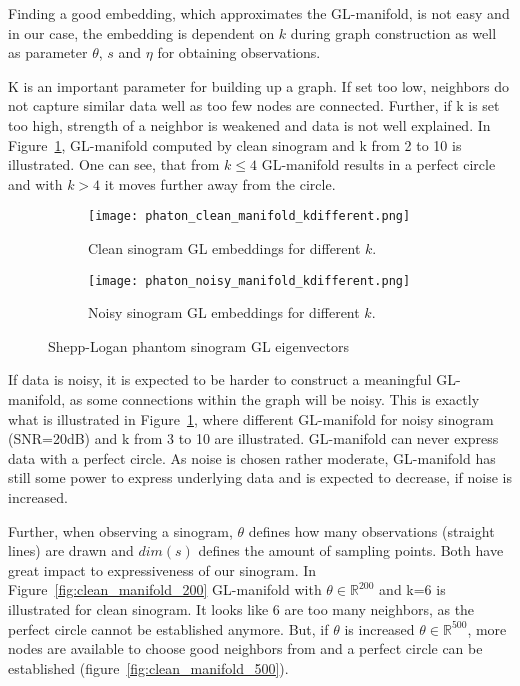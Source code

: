 Finding a good embedding, which approximates the GL-manifold, is not easy and in our case, the embedding is dependent on $k$ during graph construction
as well as parameter $\theta$, $s$ and $\eta$ for obtaining observations.

K is an important parameter for building up a graph. If set too low, neighbors
do not capture similar data well as too few nodes are connected. 
Further, if k is set too high, strength of a neighbor 
is weakened and data is not well explained.
In Figure~\ref{fig:clean_manifolds}, GL-manifold computed by clean sinogram and k from 2 to 10 is illustrated.
One can see, that from $k \leq 4$ GL-manifold results in a perfect circle and with $k >  4$ it moves 
further away from the circle. 


\begin{figure}[H]
    \captionsetup[subfigure]{justification=centering}
    \centering
    \begin{subfigure}[t]{0.45\textwidth}
        \texttt{[image: phaton\_clean\_manifold\_kdifferent.png]}
        \caption{Clean sinogram GL embeddings for different $k$.}
        \label{fig:clean_manifolds}
    \end{subfigure}\hfill
    \begin{subfigure}[t]{0.45\textwidth}
      \texttt{[image: phaton\_noisy\_manifold\_kdifferent.png]}
      \caption{Noisy sinogram GL embeddings for different $k$.}
      \label{fig:noisy_manifolds}
    \end{subfigure}\hfill
    \caption{Shepp-Logan phantom sinogram GL eigenvectors}
  \end{figure}

If data is noisy, it is expected to be harder to construct a meaningful GL-manifold, as some connections within
the graph will be noisy. This is exactly what is illustrated in Figure~\ref{fig:clean_manifolds}, where 
different GL-manifold for noisy sinogram (SNR=20dB) and k from 3 to 10 are illustrated.
GL-manifold can never express data with a perfect circle. As noise is chosen rather moderate, GL-manifold has still some 
power to express underlying data and is expected to decrease, if noise is increased.


Further, when observing a sinogram, $\theta$ defines how many observations (straight lines) are drawn
and $dim(s)$ defines the amount of sampling points. Both have great impact to expressiveness of our sinogram.
In Figure~\ref{fig:clean_manifold_200} GL-manifold with $\theta \in \mathbb{R}^{200}$ and k=6 is illustrated
for clean sinogram. It looks like 6 are too many neighbors, as the perfect circle cannot be established anymore.
But, if $\theta$ is increased $\theta \in \mathbb{R}^{500}$, more nodes are available to choose good neighbors from
and a perfect circle can be established (figure~\ref{fig:clean_manifold_500}).


